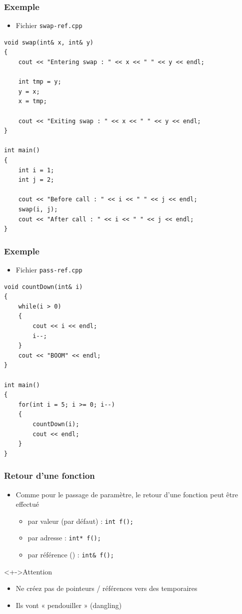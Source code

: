 \begin{frame}[containsverbatim]
\frametitle{Exemple}
\begin{itemize}[<+->]
\item Fichier \texttt{swap-ref.cpp}
\end{itemize}
\begin{lstlisting}
void swap(int& x, int& y)
{
	cout << "Entering swap : " << x << " " << y << endl;	

	int tmp = y;
	y = x;
	x = tmp;

	cout << "Exiting swap : " << x << " " << y << endl;
}

int main()
{
	int i = 1;
	int j = 2;

	cout << "Before call : " << i << " " << j << endl;
	swap(i, j);
	cout << "After call : " << i << " " << j << endl;
}
\end{lstlisting}
\end{frame}

\begin{frame}[containsverbatim]
\frametitle{Exemple}
\begin{itemize}[<+->]
\item Fichier \texttt{pass-ref.cpp}
\end{itemize}
\begin{lstlisting}
void countDown(int& i)
{
	while(i > 0)
	{
		cout << i << endl;
		i--;
	}
	cout << "BOOM" << endl;
}

int main()
{
	for(int i = 5; i >= 0; i--)
	{
		countDown(i);
		cout << endl;
	}
}
\end{lstlisting}
\end{frame}

\begin{frame}
\frametitle{Retour d'une fonction}
\begin{itemize}[<+->]
\item Comme pour le passage de paramètre, le retour d'une fonction peut être effectué
	\begin{itemize}
	\item par valeur (par défaut) : \lstinline|int f();|
	\item par adresse : \lstinline|int* f();|
	\item par référence (\cpp) : \lstinline|int& f();|
	\end{itemize}
\end{itemize}
\begin{alertblock}<+->{Attention}
	\begin{itemize}[<+->]
	\item Ne créez pas de pointeurs / références vers des temporaires
	\item Ils vont « pendouiller » (dangling)
	\end{itemize}
\end{alertblock}
\end{frame}


